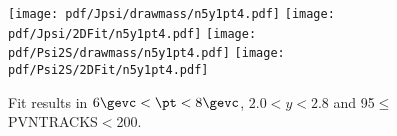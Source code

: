\begin{figure}[H]
\begin{center}
\texttt{[image: pdf/Jpsi/drawmass/n5y1pt4.pdf]}
\texttt{[image: pdf/Jpsi/2DFit/n5y1pt4.pdf]}
\vspace*{-0.5cm}
\texttt{[image: pdf/Psi2S/drawmass/n5y1pt4.pdf]}
\texttt{[image: pdf/Psi2S/2DFit/n5y1pt4.pdf]}
\vspace*{-0.5cm}
\end{center}
\caption{Fit results in $6\gevc<\pt<8\gevc$, $2.0<y<2.8$ and 95$\leq$PVNTRACKS$<$200.}
\label{Fitn5y1pt4}
\end{figure}
